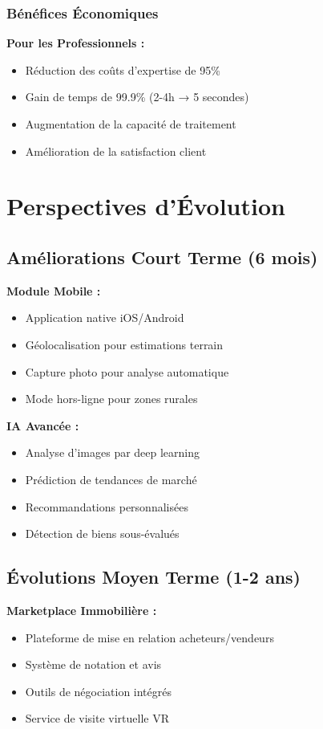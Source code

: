 \subsubsection{Bénéfices Économiques}

\textbf{Pour les Professionnels :}
\begin{itemize}
    \item Réduction des coûts d'expertise de 95\%
    \item Gain de temps de 99.9\% (2-4h → 5 secondes)
    \item Augmentation de la capacité de traitement
    \item Amélioration de la satisfaction client
\end{itemize}

\section{Perspectives d'Évolution}

\subsection{Améliorations Court Terme (6 mois)}

\textbf{Module Mobile :}
\begin{itemize}
    \item Application native iOS/Android
    \item Géolocalisation pour estimations terrain
    \item Capture photo pour analyse automatique
    \item Mode hors-ligne pour zones rurales
\end{itemize}

\textbf{IA Avancée :}
\begin{itemize}
    \item Analyse d'images par deep learning
    \item Prédiction de tendances de marché
    \item Recommandations personnalisées
    \item Détection de biens sous-évalués
\end{itemize}

\subsection{Évolutions Moyen Terme (1-2 ans)}

\textbf{Marketplace Immobilière :}
\begin{itemize}
    \item Plateforme de mise en relation acheteurs/vendeurs
    \item Système de notation et avis
    \item Outils de négociation intégrés
    \item Service de visite virtuelle VR
\end{itemize}

